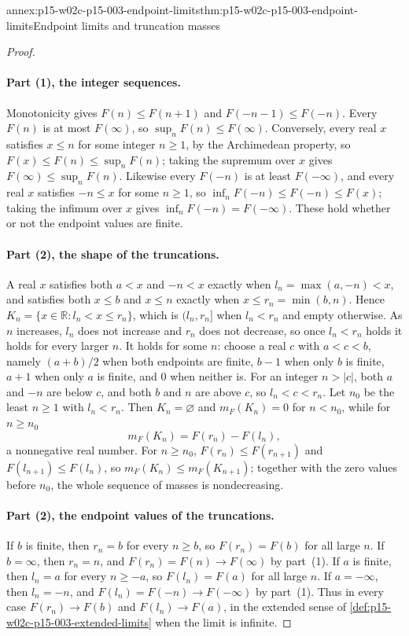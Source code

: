 \begin{annexitem}{annex:p15-w02c-p15-003-endpoint-limits}{thm:p15-w02c-p15-003-endpoint-limits}{Endpoint limits and truncation masses}
\begin{proof}
\paragraph{Part (1), the integer sequences.}
Monotonicity gives \(F(n)\leq F(n+1)\) and \(F(-n-1)\leq F(-n)\).
Every \(F(n)\) is at most \(F(\infty)\), so
\(\sup_nF(n)\leq F(\infty)\). Conversely, every real \(x\) satisfies
\(x\leq n\) for some integer \(n\geq1\), by the Archimedean property, so
\(F(x)\leq F(n)\leq\sup_nF(n)\); taking the supremum over \(x\) gives
\(F(\infty)\leq\sup_nF(n)\). Likewise every \(F(-n)\) is at least
\(F(-\infty)\), and every real \(x\) satisfies \(-n\leq x\) for some
\(n\geq1\), so \(\inf_nF(-n)\leq F(-n)\leq F(x)\); taking the infimum
over \(x\) gives \(\inf_nF(-n)=F(-\infty)\). These hold whether or not
the endpoint values are finite.

\paragraph{Part (2), the shape of the truncations.}
A real \(x\) satisfies both \(a<x\) and \(-n<x\) exactly when
\(l_n=\max(a,-n)<x\), and satisfies both \(x\leq b\) and \(x\leq n\)
exactly when \(x\leq r_n=\min(b,n)\). Hence
\(K_n=\{x\in\mathbb R:l_n<x\leq r_n\}\), which is \((l_n,r_n]\) when
\(l_n<r_n\) and empty otherwise. As \(n\) increases, \(l_n\) does not
increase and \(r_n\) does not decrease, so once \(l_n<r_n\) holds it
holds for every larger \(n\). It holds for some \(n\): choose a real
\(c\) with \(a<c<b\), namely \((a+b)/2\) when both endpoints are finite,
\(b-1\) when only \(b\) is finite, \(a+1\) when only \(a\) is finite,
and \(0\) when neither is. For an integer \(n>|c|\), both \(a\) and
\(-n\) are below \(c\), and both \(b\) and \(n\) are above \(c\), so
\(l_n<c<r_n\). Let \(n_0\) be the least \(n\geq1\) with
\(l_n<r_n\). Then \(K_n=\varnothing\) and \(m_F(K_n)=0\) for
\(n<n_0\), while for \(n\geq n_0\)
\[
 m_F(K_n)=F(r_n)-F(l_n),
\]
a nonnegative real number. For \(n\geq n_0\),
\(F(r_n)\leq F(r_{n+1})\) and \(F(l_{n+1})\leq F(l_n)\), so
\(m_F(K_n)\leq m_F(K_{n+1})\); together with the zero values before
\(n_0\), the whole sequence of masses is nondecreasing.

\paragraph{Part (2), the endpoint values of the truncations.}
If \(b\) is finite, then \(r_n=b\) for every \(n\geq b\), so
\(F(r_n)=F(b)\) for all large \(n\). If \(b=\infty\), then
\(r_n=n\), and \(F(r_n)=F(n)\to F(\infty)\) by part~(1). If \(a\) is
finite, then \(l_n=a\) for every \(n\geq-a\), so \(F(l_n)=F(a)\) for
all large \(n\). If \(a=-\infty\), then \(l_n=-n\), and
\(F(l_n)=F(-n)\to F(-\infty)\) by part~(1). Thus in every case
\(F(r_n)\to F(b)\) and \(F(l_n)\to F(a)\), in the extended sense of
\cref{def:p15-w02c-p15-003-extended-limits} when the limit is infinite.


\end{proof}
\end{annexitem}
